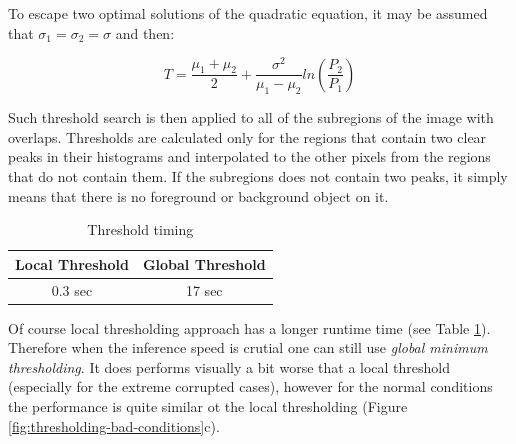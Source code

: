 To escape two optimal solutions of the quadratic equation, it may be assumed that $\sigma_1 = \sigma_2 = \sigma$ and then:

\begin{equation}
    T = \frac{\mu_1 + \mu_2}{2} + \frac{\sigma^2}{\mu_1 - \mu_2}ln\left(\frac{P_2}{P_1}\right)
\end{equation}

Such threshold search is then applied to all of the subregions of the image with overlaps. Thresholds are calculated only for the regions that contain two clear peaks in their histograms and interpolated to the other pixels from the regions that do not contain them. If the subregions does not contain two peaks, it simply means that there is no foreground or background object on it. 

\begin{table}[htb]
  \centering
      \begin{tabular}{||c c||} 
       \hline
       Local Threshold & Global Threshold \\ [0.5ex] 
       \hline\hline
       0.3 sec & 17 sec  \\ 
       \hline
      \end{tabular}
      \caption{Threshold timing}
      \label{table:threshold-timing}
  \end{table}
  
Of course local thresholding approach has a longer runtime time (see Table \ref{table:threshold-timing}). Therefore when the inference speed is crutial one can still use \textit{global minimum thresholding}. It does performs visually a bit worse that a local threshold (especially for the extreme corrupted cases), however for the normal conditions the performance is quite similar ot the local thresholding (Figure \ref{fig:thresholding-bad-conditions}c).


